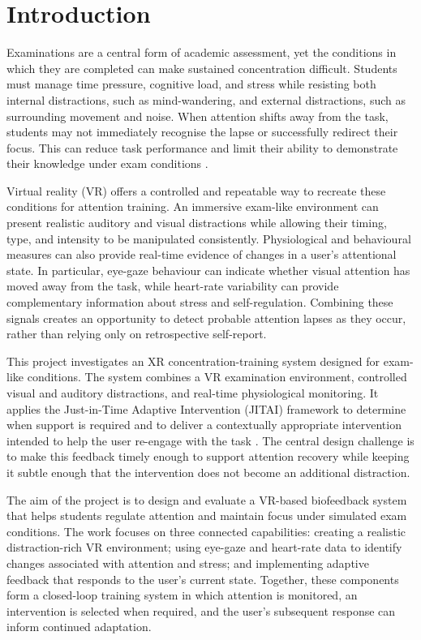 \documentclass[11pt,a4paper]{article}
\begin{document}
\clearpage
\section{Introduction}

Examinations are a central form of academic assessment, yet the conditions in
which they are completed can make sustained concentration difficult. Students
must manage time pressure, cognitive load, and stress while resisting both
internal distractions, such as mind-wandering, and external distractions, such
as surrounding movement and noise. When attention shifts away from the task,
students may not immediately recognise the lapse or successfully redirect their
focus. This can reduce task performance and limit their ability to demonstrate
their knowledge under exam conditions \cite{smallwood2015,mooneyham2013}.

Virtual reality (VR) offers a controlled and repeatable way to recreate these
conditions for attention training. An immersive exam-like environment can
present realistic auditory and visual distractions while allowing their timing,
type, and intensity to be manipulated consistently. Physiological and
behavioural measures can also provide real-time evidence of changes in a user's
attentional state. In particular, eye-gaze behaviour can indicate whether visual
attention has moved away from the task, while heart-rate variability can provide
complementary information about stress and self-regulation. Combining these
signals creates an opportunity to detect probable attention lapses as they occur,
rather than relying only on retrospective self-report.

This project investigates an XR concentration-training system designed for
exam-like conditions. The system combines a VR examination environment,
controlled visual and auditory distractions, and real-time physiological
monitoring. It applies the Just-in-Time Adaptive Intervention (JITAI) framework
to determine when support is required and to deliver a contextually appropriate
intervention intended to help the user re-engage with the task
\cite{nahumshani2018}. The central design challenge is to make this feedback
timely enough to support attention recovery while keeping it subtle enough that
the intervention does not become an additional distraction.

The aim of the project is to design and evaluate a VR-based biofeedback system
that helps students regulate attention and maintain focus under simulated exam
conditions. The work focuses on three connected capabilities: creating a
realistic distraction-rich VR environment; using eye-gaze and heart-rate data to
identify changes associated with attention and stress; and implementing adaptive
feedback that responds to the user's current state. Together, these components
form a closed-loop training system in which attention is monitored, an
intervention is selected when required, and the user's subsequent response can
inform continued adaptation.
\end{document}

